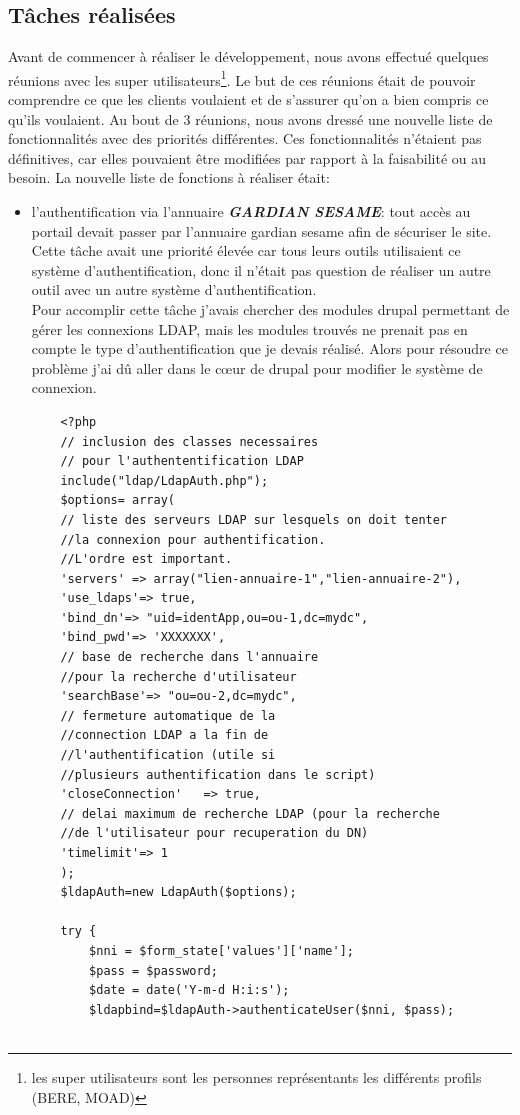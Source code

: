 \subsection*{Tâches réalisées}
Avant de commencer à réaliser le développement, nous avons effectué quelques réunions avec les super utilisateurs\footnote{les super utilisateurs sont les personnes représentants les différents profils (BERE, MOAD) }. 
Le but de ces réunions était de pouvoir comprendre ce que les clients voulaient et de s'assurer qu'on a bien compris ce qu'ils voulaient. Au bout de 3 réunions, nous avons dressé une nouvelle liste de fonctionnalités avec des priorités différentes. Ces fonctionnalités n'étaient pas définitives, car elles pouvaient être modifiées par rapport à la faisabilité ou au besoin.
La nouvelle liste de fonctions à réaliser était: 
\begin{itemize}
\item l'authentification via l'annuaire \textbf{\textit{GARDIAN SESAME}}: tout accès au portail devait passer par l'annuaire gardian sesame afin de sécuriser le site. Cette tâche avait une priorité élevée car tous leurs outils utilisaient ce système d'authentification, donc il n'était pas question de réaliser un autre outil avec un autre système d'authentification.\\
Pour accomplir cette tâche j'avais chercher des modules drupal permettant de gérer les connexions LDAP, mais les modules trouvés ne prenait pas en compte le type d'authentification que je devais réalisé. Alors pour résoudre ce problème j'ai dû aller dans le cœur de drupal pour modifier le système de connexion.
\begin{lstlisting}
	<?php
	// inclusion des classes necessaires
	// pour l'authententification LDAP 
	include("ldap/LdapAuth.php");
	$options= array(
	// liste des serveurs LDAP sur lesquels on doit tenter 
	//la connexion pour authentification. 
	//L'ordre est important.
	'servers' => array("lien-annuaire-1","lien-annuaire-2"),
	'use_ldaps'=> true,
	'bind_dn'=> "uid=identApp,ou=ou-1,dc=mydc",
	'bind_pwd'=> 'XXXXXXX',
	// base de recherche dans l'annuaire 
	//pour la recherche d'utilisateur
	'searchBase'=> "ou=ou-2,dc=mydc",
	// fermeture automatique de la 
	//connection LDAP a la fin de 
	//l'authentification (utile si 
	//plusieurs authentification dans le script)
	'closeConnection'	=> true,
	// delai maximum de recherche LDAP (pour la recherche 
	//de l'utilisateur pour recuperation du DN)
	'timelimit'=> 1
	);
	$ldapAuth=new LdapAuth($options);
	
	try {
		$nni = $form_state['values']['name'];
		$pass = $password;
		$date = date('Y-m-d H:i:s');
		$ldapbind=$ldapAuth->authenticateUser($nni, $pass);
		

\end{lstlisting}
\end{itemize}
